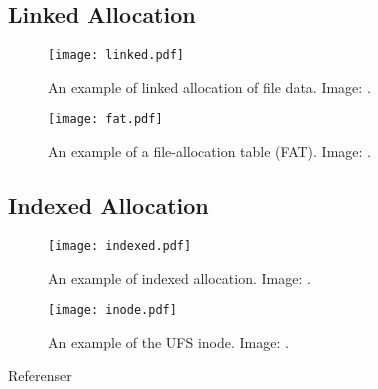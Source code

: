 \documentclass{beamer}
\begin{document}
\subsection{Linked Allocation}

\begin{frame}{\insertsubsectionhead}
  \begin{figure}
    \texttt{[image: linked.pdf]}
    \caption{An example of linked allocation of file data.
      Image: \cite{Silberschatz2013osc}.}
  \end{figure}
\end{frame}

\begin{frame}{\insertsubsectionhead}
  \begin{figure}
    \texttt{[image: fat.pdf]}
    \caption{An example of a file-allocation table (FAT).
      Image: \cite{Silberschatz2013osc}.}
  \end{figure}
\end{frame}

\subsection{Indexed Allocation}

\begin{frame}{\insertsubsectionhead}
  \begin{figure}
    \texttt{[image: indexed.pdf]}
    \caption{An example of indexed allocation.
      Image: \cite{Silberschatz2013osc}.}
  \end{figure}
\end{frame}

\begin{frame}{\insertsubsectionhead}
  \begin{figure}
    \texttt{[image: inode.pdf]}
    \caption{An example of the UFS inode.
      Image: \cite{Silberschatz2013osc}.}
  \end{figure}
\end{frame}




\begin{frame}[allowframebreaks]{Referenser}
  \small
  \printbibliography
\end{frame}
\end{document}
